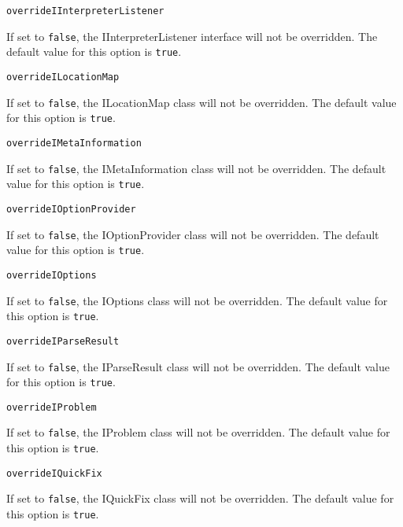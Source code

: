 \noindent\texttt{overrideIInterpreterListener}
\begin{myindentpar}{1cm}
If set to \texttt{false}, the IInterpreterListener interface will not be overridden. The default value for this option is \texttt{true}.
\end{myindentpar}

\noindent\texttt{overrideILocationMap}
\begin{myindentpar}{1cm}
If set to \texttt{false}, the ILocationMap class will not be overridden. The default value for this option is \texttt{true}.
\end{myindentpar}

\noindent\texttt{overrideIMetaInformation}
\begin{myindentpar}{1cm}
If set to \texttt{false}, the IMetaInformation class will not be overridden. The default value for this option is \texttt{true}.
\end{myindentpar}

\noindent\texttt{overrideIOptionProvider}
\begin{myindentpar}{1cm}
If set to \texttt{false}, the IOptionProvider class will not be overridden. The default value for this option is \texttt{true}.
\end{myindentpar}

\noindent\texttt{overrideIOptions}
\begin{myindentpar}{1cm}
If set to \texttt{false}, the IOptions class will not be overridden. The default value for this option is \texttt{true}.
\end{myindentpar}

\noindent\texttt{overrideIParseResult}
\begin{myindentpar}{1cm}
If set to \texttt{false}, the IParseResult class will not be overridden. The default value for this option is \texttt{true}.
\end{myindentpar}

\noindent\texttt{overrideIProblem}
\begin{myindentpar}{1cm}
If set to \texttt{false}, the IProblem class will not be overridden. The default value for this option is \texttt{true}.
\end{myindentpar}

\noindent\texttt{overrideIQuickFix}
\begin{myindentpar}{1cm}
If set to \texttt{false}, the IQuickFix class will not be overridden. The default value for this option is \texttt{true}.
\end{myindentpar}

